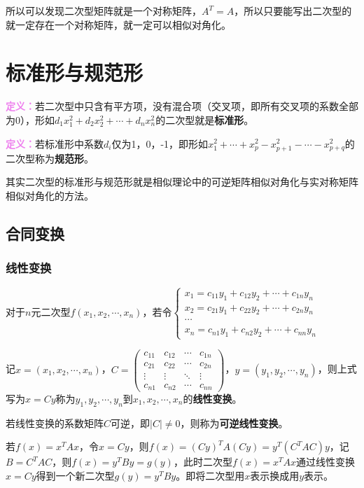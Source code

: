 \documentclass[UTF8, 12pt]{ctexart}
\begin{document}
所以可以发现二次型矩阵就是一个对称矩阵，$A^T=A$，所以只要能写出二次型的就一定存在一个对称矩阵，就一定可以相似对角化。

\section{标准形与规范形}

\textcolor{violet}{\textbf{定义：}}若二次型中只含有平方项，没有混合项（交叉项，即所有交叉项的系数全部为0），形如$d_1x_1^2+d_2x_2^2+\cdots+d_nx_n^2$的二次型就是\textbf{标准形}。

\textcolor{violet}{\textbf{定义：}}若标准形中系数$d_i$仅为1，0，-1，即形如$x_1^2+\cdots+x_p^2-x_{p+1}^2-\cdots-x_{p+q}^2$的二次型称为\textbf{规范形}。

其实二次型的标准形与规范形就是相似理论中的可逆矩阵相似对角化与实对称矩阵相似对角化的方法。

\subsection{合同变换}

\subsubsection{线性变换}

对于$n$元二次型$f(x_1,x_2,\cdots,x_n)$，若令$\left\{\begin{array}{l}
    x_1=c_{11}y_1+c_{12}y_2+\cdots+c_{1n}y_n \\
    x_2=c_{21}y_1+c_{22}y_2+\cdots+c_{2n}y_n \\
    \cdots \\
    x_n=c_{n1}y_1+c_{n2}y_2+\cdots+c_{nn}y_n
\end{array}\right.$

记$x=(x_1,x_2,\cdots,x_n)$，$C=\left(\begin{array}{cccc}
    c_{11} & c_{12} & \cdots & c_{1n} \\
    c_{21} & c_{22} & \cdots & c_{2n} \\
    \vdots & \vdots & \ddots & \vdots \\
    c_{n1} & c_{n2} & \cdots & c_{nn}
\end{array}\right)$，$y=(y_1,y_2,\cdots,y_n)$，则上式写为$x=Cy$称为$y_1,y_2,\cdots,y_n$到$x_1,x_2,\cdots,x_n$的\textbf{线性变换}。

若线性变换的系数矩阵$C$可逆，即$\vert C\vert\neq0$，则称为\textbf{可逆线性变换}。

若$f(x)=x^TAx$，令$x=Cy$，则$f(x)=(Cy)^TA(Cy)=y^T(C^TAC)y$，记$B=C^TAC$，则$f(x)=y^TBy=g(y)$，此时二次型$f(x)=x^TAx$通过线性变换$x=Cy$得到一个新二次型$g(y)=y^TBy$。即将二次型用$x$表示换成用$y$表示。
\end{document}
